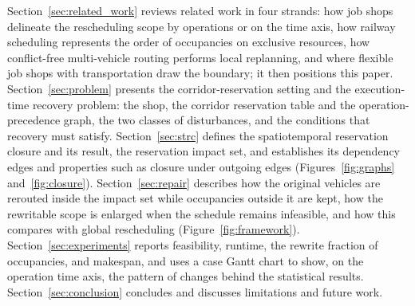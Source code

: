 \documentclass[manuscript,screen,review]{acmart}
\begin{document}
Section~\ref{sec:related_work} reviews related work in four strands: how job shops delineate the rescheduling scope by operations or on the time axis,
how railway scheduling represents the order of occupancies on exclusive resources, how conflict-free multi-vehicle routing performs local replanning,
and where flexible job shops with transportation draw the boundary; it then positions this paper.
Section~\ref{sec:problem} presents the corridor-reservation setting and the execution-time recovery problem:
the shop, the corridor reservation table and the operation-precedence graph, the two classes of disturbances, and the conditions that recovery must satisfy.
Section~\ref{sec:strc} defines the spatiotemporal reservation closure and its result, the reservation impact set, and establishes its dependency edges and properties such as closure under outgoing edges
(Figures~\ref{fig:graphs} and~\ref{fig:closure}).
Section~\ref{sec:repair} describes how the original vehicles are rerouted inside the impact set while occupancies outside it are kept,
how the rewritable scope is enlarged when the schedule remains infeasible, and how this compares with global rescheduling (Figure~\ref{fig:framework}).
Section~\ref{sec:experiments} reports feasibility, runtime, the rewrite fraction of occupancies, and makespan,
and uses a case Gantt chart to show, on the operation time axis, the pattern of changes behind the statistical results.
Section~\ref{sec:conclusion} concludes and discusses limitations and future work.
\end{document}
